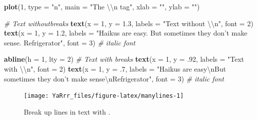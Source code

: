 \documentclass[]{book}
\newenvironment{Shaded}{\begin{snugshade}}{\end{snugshade}}
\newcommand{\KeywordTok}[1]{\textcolor[rgb]{0.13,0.29,0.53}{\textbf{#1}}}
\newcommand{\DataTypeTok}[1]{\textcolor[rgb]{0.13,0.29,0.53}{#1}}
\newcommand{\DecValTok}[1]{\textcolor[rgb]{0.00,0.00,0.81}{#1}}
\newcommand{\FloatTok}[1]{\textcolor[rgb]{0.00,0.00,0.81}{#1}}
\newcommand{\CharTok}[1]{\textcolor[rgb]{0.31,0.60,0.02}{#1}}
\newcommand{\StringTok}[1]{\textcolor[rgb]{0.31,0.60,0.02}{#1}}
\newcommand{\CommentTok}[1]{\textcolor[rgb]{0.56,0.35,0.01}{\textit{#1}}}
\newcommand{\NormalTok}[1]{#1}
\theoremstyle{definition}
\theoremstyle{definition}
\theoremstyle{remark}
\begin{document}
\begin{Shaded}
\begin{Highlighting}[]
\KeywordTok{plot}\NormalTok{(}\DecValTok{1}\NormalTok{, }
     \DataTypeTok{type =} \StringTok{"n"}\NormalTok{,}
     \DataTypeTok{main =} \StringTok{"The }\CharTok{\textbackslash{}\textbackslash{}}\StringTok{n tag"}\NormalTok{,}
     \DataTypeTok{xlab =} \StringTok{""}\NormalTok{, }\DataTypeTok{ylab =} \StringTok{""}\NormalTok{)}

\CommentTok{# Text withoutbreaks}
\KeywordTok{text}\NormalTok{(}\DataTypeTok{x =} \DecValTok{1}\NormalTok{, }\DataTypeTok{y =} \FloatTok{1.3}\NormalTok{, }\DataTypeTok{labels =} \StringTok{"Text without }\CharTok{\textbackslash{}\textbackslash{}}\StringTok{n"}\NormalTok{, }\DataTypeTok{font =} \DecValTok{2}\NormalTok{)}
\KeywordTok{text}\NormalTok{(}\DataTypeTok{x =} \DecValTok{1}\NormalTok{, }\DataTypeTok{y =} \FloatTok{1.2}\NormalTok{,}
     \DataTypeTok{labels =} \StringTok{"Haikus are easy. But sometimes they don't make sense. Refrigerator"}\NormalTok{,}
     \DataTypeTok{font =} \DecValTok{3}\NormalTok{) }\CommentTok{# italic font}

\KeywordTok{abline}\NormalTok{(}\DataTypeTok{h =} \DecValTok{1}\NormalTok{, }\DataTypeTok{lty =} \DecValTok{2}\NormalTok{)}
\CommentTok{# Text with  breaks}
\KeywordTok{text}\NormalTok{(}\DataTypeTok{x =} \DecValTok{1}\NormalTok{, }\DataTypeTok{y =}\NormalTok{ .}\DecValTok{92}\NormalTok{, }\DataTypeTok{labels =} \StringTok{"Text with }\CharTok{\textbackslash{}\textbackslash{}}\StringTok{n"}\NormalTok{, }\DataTypeTok{font =} \DecValTok{2}\NormalTok{)}
\KeywordTok{text}\NormalTok{(}\DataTypeTok{x =} \DecValTok{1}\NormalTok{, }\DataTypeTok{y =}\NormalTok{ .}\DecValTok{7}\NormalTok{,}
     \DataTypeTok{labels =} \StringTok{"Haikus are easy}\CharTok{\textbackslash{}n}\StringTok{But sometimes they don't make sense}\CharTok{\textbackslash{}n}\StringTok{Refrigerator"}\NormalTok{,}
     \DataTypeTok{font =} \DecValTok{3}\NormalTok{)   }\CommentTok{# italic font}
\end{Highlighting}
\end{Shaded}

\begin{figure}

{\centering \texttt{[image: YaRrr\_files/figure-latex/manylines-1]} 

}

\caption{Break up lines in text with 
.}\label{fig:manylines}
\end{figure}
\end{document}
